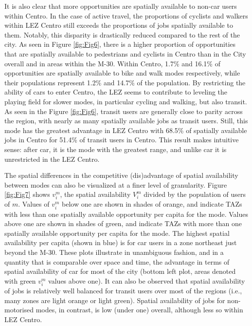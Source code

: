 \documentclass[10pt,letterpaper]{article}
\begin{document}
It is also clear that more opportunities are spatially available to
non-car users within Centro. In the case of active travel, the
proportions of cyclists and walkers within LEZ Centro still exceeds the
proportions of jobs spatially available to them. Notably, this disparity
is drastically reduced compared to the rest of the city. As seen in
Figure \ref{fig:Fig6}, there is a higher proportion of opportunities
that are spatially available to pedestrians and cyclists in Centro than
in the City overall and in areas within the M-30. Within Centro, 1.7\%
and 16.1\% of opportunities are spatially available to bike and walk
modes respectively, while their populations represent 1.2\% and 14.7\%
of the population. By restricting the ability of cars to enter Centro,
the LEZ seems to contribute to leveling the playing field for slower
modes, in particular cycling and walking, but also transit. As seen in
the Figure \ref{fig:Fig6}, transit users are generally close to parity
across the region, with nearly as many spatially available jobs as
transit users. Still, this mode has the greatest advantage in LEZ Centro
with 68.5\% of spatially available jobs in Centro for 51.4\% of transit
users in Centro. This result makes intuitive sense: after car, it is the
mode with the greatest range, and unlike car it is unrestricted in the
LEZ Centro.

The spatial differences in the competitive (dis)advantage of spatial
availability between modes can also be visualized at a finer level of
granularity. Figure \ref{fig:Fig7} shows \(v_i^m\), the spatial
availability \(V_i^m\) divided by the population of users of \(m\).
Values of \(v_i^m\) below one are shown in shades of orange, and
indicate TAZs with less than one spatially available opportunity per
capita for the mode. Values above one are shown in shades of green, and
indicate TAZs with more than one spatially available opportunity per
capita for the mode. The highest spatial availability per capita (shown
in blue) is for car users in a zone northeast just beyond the M-30.
These plots illustrate in unambiguous fashion, and in a quantity that is
comparable over space and time, the advantage in terms of spatial
availability of car for most of the city (bottom left plot, areas
denoted with green \(v_i^m\) values above one). It can also be observed
that spatial availability of jobs is relatively well balanced for
transit users over most of the regions (i.e., many zones are light
orange or light green). Spatial availability of jobs for non-motorised
modes, in contrast, is low (under one) overall, although less so within
LEZ Centro.
\end{document}
